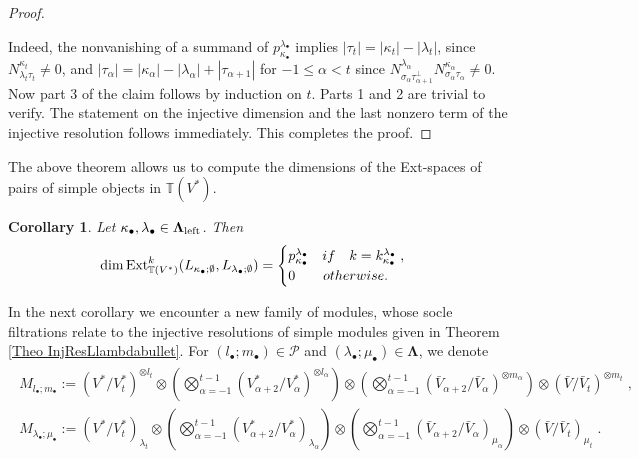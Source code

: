 \documentclass[12pt]{article}
\def\TT {{\mathbb T}}     %
\def\mc {\mathcal}
\newtheorem{coro}[theorem]{Corollary}
\begin{document}
\begin{proof}
\begin{enumerate}
\end{enumerate}
Indeed, the nonvanishing of a summand of $p^{\lambda_\bullet}_{\kappa_\bullet}$ implies $|\tau_t|=|\kappa_t|-|\lambda_t|$, since $N^{\kappa_t}_{\lambda_t \tau_t}\ne0$, and $|\tau_\alpha|=|\kappa_\alpha|-|\lambda_\alpha|+|\tau_{\alpha+1}|$ for $-1\leq\alpha<t$ since $N^{\lambda_\alpha}_{\sigma_\alpha \tau_{\alpha+1}^\perp} N^{\kappa_\alpha}_{\sigma_\alpha \tau_\alpha}\ne 0$. Now part 3 of the claim follows by induction on $t$. Parts 1 and 2 are trivial to verify. The statement on the injective dimension and the last nonzero term of the injective resolution follows immediately. This completes the proof.
\end{proof}

The above theorem allows us to compute the dimensions of the Ext-spaces of pairs of simple objects in $\TT(V^*)$.

\begin{coro}\label{Coro dimExtsimples in Tleft}
Let $\kappa_\bullet,\lambda_\bullet\in\bm\Lambda_{\rm left}$. Then
$$
\dim {\rm Ext}_{\TT(V^*)}^k (L_{\kappa_\bullet;\emptyset},L_{\lambda_\bullet;\emptyset}) =\begin{cases} p^{\lambda_\bullet}_{\kappa_\bullet} \quad if \quad k=k^{\lambda_\bullet}_{\kappa_\bullet} \;, \\ 0 \qquad otherwise . \end{cases}
$$
\end{coro}


In the next corollary we encounter a new family of modules, whose socle filtrations relate to the injective resolutions of simple modules given in Theorem \ref{Theo InjResLlambdabullet}. For $(l_\bullet;m_\bullet)\in\mc P$ and $(\lambda_\bullet;\mu_\bullet)\in\bm\Lambda$, we denote
\begin{gather}\label{For Modules M}
\begin{array}{l}
M_{l_\bullet;m_\bullet}:= (V^*/V^*_{t})^{\otimes l_t} \otimes \left(\bigotimes\limits_{\alpha=-1}^{t-1} (V^*_{\alpha+2}/V^*_{\alpha})^{\otimes l_\alpha}\right) \otimes \left(\bigotimes\limits_{\alpha=-1}^{t-1} (\bar V_{\alpha+2}/\bar V_{\alpha})^{\otimes m_\alpha}\right) \otimes (\bar V/\bar V_t)^{\otimes m_t}\;,\\
M_{\lambda_\bullet;\mu_\bullet}:= (V^*/V^*_{t})_{\lambda_t} \otimes \left(\bigotimes\limits_{\alpha=-1}^{t-1} (V^*_{\alpha+2}/V^*_{\alpha})_{\lambda_\alpha}\right) \otimes \left(\bigotimes\limits_{\alpha=-1}^{t-1} (\bar V_{\alpha+2}/\bar V_{\alpha})_{\mu_\alpha}\right) \otimes (\bar V/\bar V_t)_{\mu_t}\;.
\end{array}
\end{gather}
\end{document}
